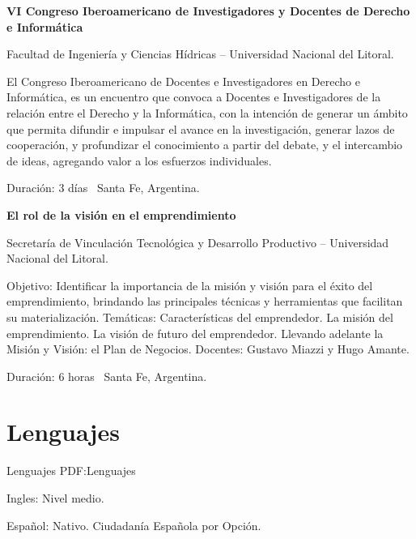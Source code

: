\documentclass[letterpaper,MMMyyyy,nonstop]{simpleresumecv}
\begin{document}
\begin{body}
\BigGap
\textbf{VI Congreso Iberoamericano de Investigadores y Docentes de Derecho e Informática}
\hfill
{}

\BulletItem Facultad de Ingeniería y Ciencias Hídricas – Universidad Nacional del Litoral.
\begin{detail}
	\SubBulletItem
	El Congreso Iberoamericano de Docentes e Investigadores en Derecho e Informática, es un encuentro que convoca a Docentes e Investigadores de la relación entre el Derecho y la Informática, con la intención de generar un ámbito que permita difundir e impulsar el avance en la investigación, generar lazos de cooperación, y profundizar el conocimiento a partir del debate, y el intercambio de ideas, agregando valor a los esfuerzos individuales.
\end{detail}
Duración: 3 días \SubBulletSymbol\, Santa Fe, Argentina.

\BigGap
\textbf{El rol de la visión en el emprendimiento}
\hfill
{}

\BulletItem Secretaría de Vinculación Tecnológica y Desarrollo Productivo – Universidad Nacional del Litoral.
\begin{detail}
	\SubBulletItem
	Objetivo: Identificar la importancia de la misión y visión para el éxito del emprendimiento, brindando las principales técnicas y herramientas que facilitan su materialización.
	\SubBulletItem
	Temáticas: Características del emprendedor. La misión del emprendimiento. La visión de futuro del emprendedor. Llevando adelante la Misión y Visión: el Plan de Negocios.
	\SubBulletItem
	Docentes: Gustavo Miazzi y Hugo Amante. 
\end{detail}
Duración: 6 horas \SubBulletSymbol\, Santa Fe, Argentina.


\section
{Lenguajes}
{Lenguajes}
{PDF:Lenguajes}

\BulletItem
Ingles: Nivel medio.

\GapNoBreak
\BulletItem
Español: Nativo.
\GapNoBreak
\BulletItem
Ciudadanía Española por Opción.



\end{body}
\end{document}
